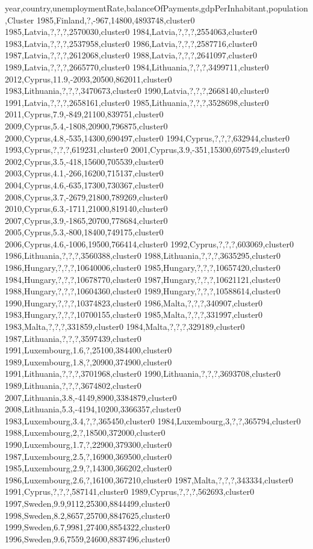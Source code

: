 year,country,unemploymentRate,balanceOfPayments,gdpPerInhabitant,population,Cluster
1985,Finland,?,-967,14800,4893748,cluster0
1985,Latvia,?,?,?,2570030,cluster0
1984,Latvia,?,?,?,2554063,cluster0
1983,Latvia,?,?,?,2537958,cluster0
1986,Latvia,?,?,?,2587716,cluster0
1987,Latvia,?,?,?,2612068,cluster0
1988,Latvia,?,?,?,2641097,cluster0
1989,Latvia,?,?,?,2665770,cluster0
1984,Lithuania,?,?,?,3499711,cluster0
2012,Cyprus,11.9,-2093,20500,862011,cluster0
1983,Lithuania,?,?,?,3470673,cluster0
1990,Latvia,?,?,?,2668140,cluster0
1991,Latvia,?,?,?,2658161,cluster0
1985,Lithuania,?,?,?,3528698,cluster0
2011,Cyprus,7.9,-849,21100,839751,cluster0
2009,Cyprus,5.4,-1808,20900,796875,cluster0
2000,Cyprus,4.8,-535,14300,690497,cluster0
1994,Cyprus,?,?,?,632944,cluster0
1993,Cyprus,?,?,?,619231,cluster0
2001,Cyprus,3.9,-351,15300,697549,cluster0
2002,Cyprus,3.5,-418,15600,705539,cluster0
2003,Cyprus,4.1,-266,16200,715137,cluster0
2004,Cyprus,4.6,-635,17300,730367,cluster0
2008,Cyprus,3.7,-2679,21800,789269,cluster0
2010,Cyprus,6.3,-1711,21000,819140,cluster0
2007,Cyprus,3.9,-1865,20700,778684,cluster0
2005,Cyprus,5.3,-800,18400,749175,cluster0
2006,Cyprus,4.6,-1006,19500,766414,cluster0
1992,Cyprus,?,?,?,603069,cluster0
1986,Lithuania,?,?,?,3560388,cluster0
1988,Lithuania,?,?,?,3635295,cluster0
1986,Hungary,?,?,?,10640006,cluster0
1985,Hungary,?,?,?,10657420,cluster0
1984,Hungary,?,?,?,10678770,cluster0
1987,Hungary,?,?,?,10621121,cluster0
1988,Hungary,?,?,?,10604360,cluster0
1989,Hungary,?,?,?,10588614,cluster0
1990,Hungary,?,?,?,10374823,cluster0
1986,Malta,?,?,?,340907,cluster0
1983,Hungary,?,?,?,10700155,cluster0
1985,Malta,?,?,?,331997,cluster0
1983,Malta,?,?,?,331859,cluster0
1984,Malta,?,?,?,329189,cluster0
1987,Lithuania,?,?,?,3597439,cluster0
1991,Luxembourg,1.6,?,25100,384400,cluster0
1989,Luxembourg,1.8,?,20900,374900,cluster0
1991,Lithuania,?,?,?,3701968,cluster0
1990,Lithuania,?,?,?,3693708,cluster0
1989,Lithuania,?,?,?,3674802,cluster0
2007,Lithuania,3.8,-4149,8900,3384879,cluster0
2008,Lithuania,5.3,-4194,10200,3366357,cluster0
1983,Luxembourg,3.4,?,?,365450,cluster0
1984,Luxembourg,3,?,?,365794,cluster0
1988,Luxembourg,2,?,18500,372000,cluster0
1990,Luxembourg,1.7,?,22900,379300,cluster0
1987,Luxembourg,2.5,?,16900,369500,cluster0
1985,Luxembourg,2.9,?,14300,366202,cluster0
1986,Luxembourg,2.6,?,16100,367210,cluster0
1987,Malta,?,?,?,343334,cluster0
1991,Cyprus,?,?,?,587141,cluster0
1989,Cyprus,?,?,?,562693,cluster0
1997,Sweden,9.9,9112,25300,8844499,cluster0
1998,Sweden,8.2,8657,25700,8847625,cluster0
1999,Sweden,6.7,9981,27400,8854322,cluster0
1996,Sweden,9.6,7559,24600,8837496,cluster0
